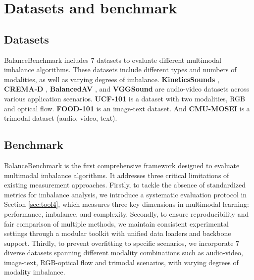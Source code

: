 \section{Datasets and benchmark} \label{sec:datasets and benchmarks}
\subsection{Datasets} \label{sec:datasets}
BalanceBenchmark includes 7 datasets to evaluate different multimodal imbalance algorithms. These datasets include different types and numbers of modalities, as well as varying degrees of imbalance. \textbf{KineticsSounds} \cite{kinetics-sounds}, \textbf{CREMA-D} \cite{cremad}, \textbf{BalancedAV} \cite{balance}, and \textbf{VGGSound} \cite{vggsound} are audio-video datasets across various application scenarios. \textbf{UCF-101} \cite{ucf101} is a dataset with two modalities, RGB and optical flow. \textbf{FOOD-101} \cite{food101} is an image-text dataset. And \textbf{CMU-MOSEI} \cite{mosei} is a trimodal dataset (audio, video, text).

\subsection{Benchmark} \label{sec:benchmarks}
BalanceBenchmark is the first comprehensive framework designed to evaluate multimodal imbalance algorithms. It addresses three critical limitations of existing measurement approaches. Firstly, to tackle the absence of standardized metrics for imbalance analysis,  we introduce a systematic evaluation protocol in Section \ref{sec:tool4}, which measures three key dimensions in multimodal learning: performance, imbalance, and complexity. Secondly, to ensure reproducibility and fair comparison of multiple methods, we maintain consistent experimental settings through a modular toolkit with unified data loaders and backbone support. Thirdly, to prevent overfitting to specific scenarios, we incorporate 7 diverse datasets spanning different modality combinations such as audio-video, image-text, RGB-optical flow and trimodal scenarios, with varying degrees of modality imbalance.

